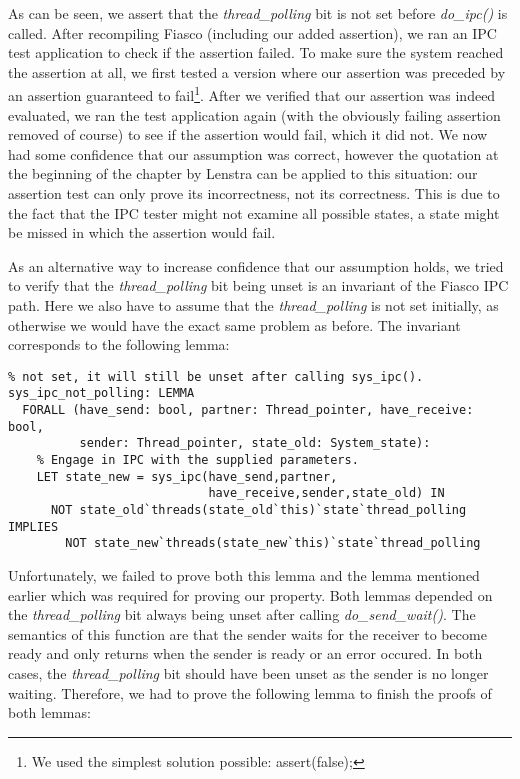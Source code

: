 As can be seen, we assert that the \emph{thread\_polling} bit is not set before \emph{do\_ipc()} is called. After recompiling Fiasco (including our added assertion), we ran an IPC test application to check if the assertion failed. To make sure the system reached the assertion at all, we first tested a version where our assertion was preceded by an assertion guaranteed to fail\footnote{We used the simplest solution possible: assert(false);}. After we verified that our assertion was indeed evaluated, we ran the test application again (with the obviously failing assertion removed of course) to see if the assertion would fail, which it did not. We now had some confidence that our assumption was correct, however the quotation at the beginning of the chapter by Lenstra can be applied to this situation: our assertion test can only prove its incorrectness, not its correctness. This is due to the fact that the IPC tester might not examine all possible states, a state might be missed in which the assertion would fail.\emptyline

As an alternative way to increase confidence that our assumption holds, we tried to verify that the \emph{thread\_polling} bit being unset is an invariant of the Fiasco IPC path. Here we also have to assume that the \emph{thread\_polling} is not set initially, as otherwise we would have the exact same problem as before. The invariant corresponds to the following lemma:

\lstset{language=PVS}
\begin{lstlisting}[caption={PVS: unset \emph{thread\_polling()} bit invariant.}]
% If we assume that initially, the <this> thread's <thread_polling> bit is
% not set, it will still be unset after calling sys_ipc().
sys_ipc_not_polling: LEMMA
  FORALL (have_send: bool, partner: Thread_pointer, have_receive: bool,
          sender: Thread_pointer, state_old: System_state):
    % Engage in IPC with the supplied parameters.
    LET state_new = sys_ipc(have_send,partner,
                            have_receive,sender,state_old) IN        
      NOT state_old`threads(state_old`this)`state`thread_polling IMPLIES
        NOT state_new`threads(state_new`this)`state`thread_polling
\end{lstlisting}

Unfortunately, we failed to prove both this lemma and the lemma mentioned earlier which was required for proving our property. Both lemmas depended on the \emph{thread\_polling} bit always being unset after calling \emph{do\_send\_wait()}. The semantics of this function are that the sender waits for the receiver to become ready and only returns when the sender is ready or an error occured. In both cases, the \emph{thread\_polling} bit should have been unset as the sender is no longer waiting. Therefore, we had to prove the following lemma to finish the proofs of both lemmas:

